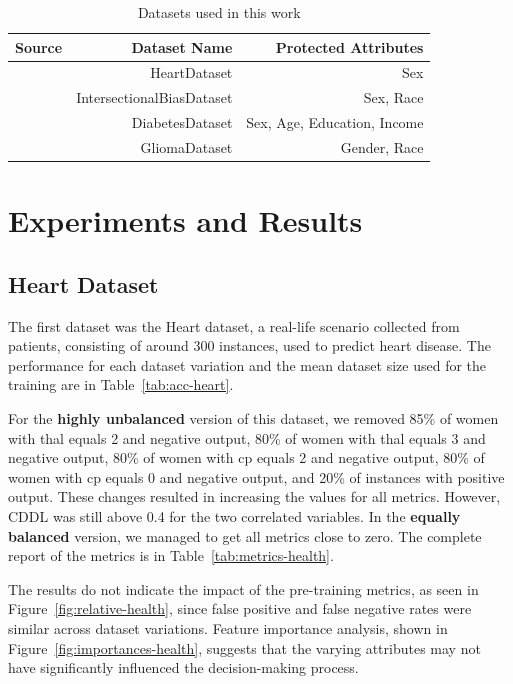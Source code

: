 \documentclass[12pt]{article}
\begin{document}
\begin{table}[h]
\centering
  \begin{tabular}{@{}rrr@{}}
  \toprule
  Source                                           & Dataset Name              & Protected Attributes        \\ \midrule
  \cite{UCI}                                       & HeartDataset              & Sex                         \\
  \cite{INTERSECTIONAL}                            & IntersectionalBiasDataset & Sex, Race                   \\
  \cite{CDC_Diabetes_Health_Indicators}            & DiabetesDataset           & Sex, Age, Education, Income \\ 
  \cite{Glioma_Grading_Clinical_Mutation_Features} & GliomaDataset             & Gender, Race                \\ \bottomrule
  \end{tabular}
  \caption{Datasets used in this work}
  \label{tab:datasets}
\end{table}
\section{Experiments and Results}

\subsection{Heart Dataset}
\label{sec:heart}
The first dataset was the Heart dataset, a real-life scenario collected from patients, consisting of around 300 instances, used to predict heart disease. The performance for each dataset variation and the mean dataset size used for the training are in Table~\ref{tab:acc-heart}.

For the \textbf{highly unbalanced} version of this dataset, we removed 85\% of women with thal equals 2 and negative output, 80\% of women with thal equals 3 and negative output, 80\% of women with cp equals 2 and negative output, 80\% of women with cp equals 0 and negative output, and 20\% of instances with positive output. These changes resulted in increasing the values for all metrics. However, CDDL was still above 0.4 for the two correlated variables. In the \textbf{equally balanced} version, we managed to get all metrics close to zero. The complete report of the metrics is in Table~\ref{tab:metrics-health}. 

The results do not indicate the impact of the pre-training metrics, as seen in Figure~\ref{fig:relative-health}, since false positive and false negative rates were similar across dataset variations. Feature importance analysis, shown in Figure~\ref{fig:importances-health}, suggests that the varying attributes may not have significantly influenced the decision-making process.
\end{document}
